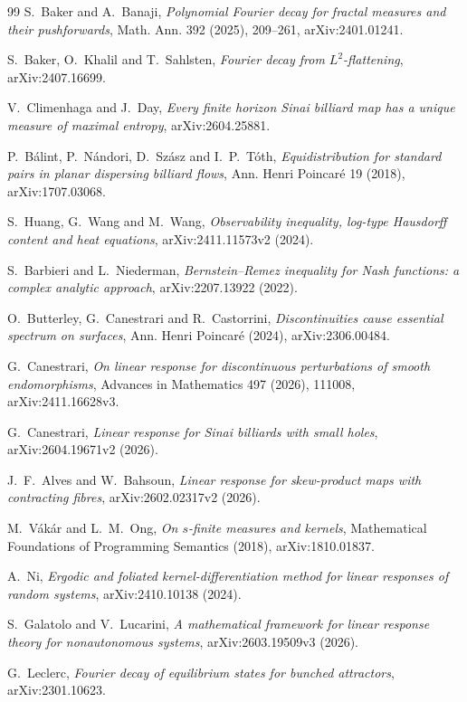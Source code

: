 \documentclass[11pt]{article}
\begin{document}
\begin{thebibliography}{99}
S.~Baker and A.~Banaji,
\emph{Polynomial Fourier decay for fractal measures and their pushforwards},
Math. Ann. 392 (2025), 209--261, arXiv:2401.01241.

S.~Baker, O.~Khalil and T.~Sahlsten,
\emph{Fourier decay from $L^2$-flattening},
arXiv:2407.16699.

V.~Climenhaga and J.~Day,
\emph{Every finite horizon Sinai billiard map has a unique measure of maximal entropy},
arXiv:2604.25881.

P.~B\'alint, P.~N\'andori, D.~Sz\'asz and I.~P.~T\'oth,
\emph{Equidistribution for standard pairs in planar dispersing billiard flows},
Ann. Henri Poincar\'e 19 (2018), arXiv:1707.03068.

S.~Huang, G.~Wang and M.~Wang,
\emph{Observability inequality, log-type Hausdorff content and heat equations},
arXiv:2411.11573v2 (2024).

S.~Barbieri and L.~Niederman,
\emph{Bernstein--Remez inequality for Nash functions: a complex analytic
approach}, arXiv:2207.13922 (2022).

O.~Butterley, G.~Canestrari and R.~Castorrini,
\emph{Discontinuities cause essential spectrum on surfaces},
Ann. Henri Poincar\'e (2024), arXiv:2306.00484.

G.~Canestrari,
\emph{On linear response for discontinuous perturbations of smooth
endomorphisms}, Advances in Mathematics 497 (2026), 111008,
arXiv:2411.16628v3.

G.~Canestrari,
\emph{Linear response for Sinai billiards with small holes},
arXiv:2604.19671v2 (2026).

J.~F.~Alves and W.~Bahsoun,
\emph{Linear response for skew-product maps with contracting fibres},
arXiv:2602.02317v2 (2026).

M.~V\'ak\'ar and L.~M.~Ong,
\emph{On $s$-finite measures and kernels},
Mathematical Foundations of Programming Semantics (2018),
arXiv:1810.01837.

A.~Ni,
\emph{Ergodic and foliated kernel-differentiation method for linear
responses of random systems}, arXiv:2410.10138 (2024).

S.~Galatolo and V.~Lucarini,
\emph{A mathematical framework for linear response theory for nonautonomous
systems}, arXiv:2603.19509v3 (2026).

G.~Leclerc,
\emph{Fourier decay of equilibrium states for bunched attractors},
arXiv:2301.10623.


\end{thebibliography}
\end{document}
